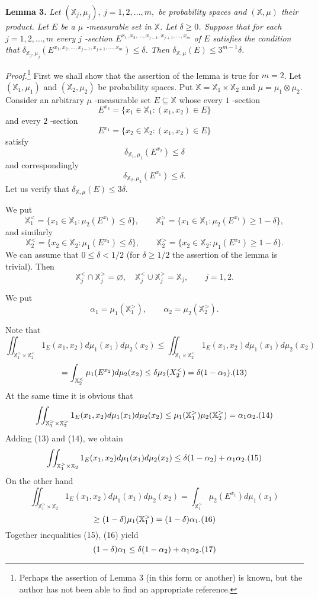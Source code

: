 \documentclass[12pt]{article}
\begin{document}
\quad

\textbf{Lemma 3.} \emph{Let $(\mathbb X_j, \mu_j), ~j=1, 2,
\ldots, m,$ be probability spaces and $(\mathbb X, \mu)$ their
product. Let $E$ be a $\mu$ -measurable set in $\mathbb X$. Let
$\delta\geq 0$. Suppose that for each $j=1, 2, \ldots, m$ every
$j$ -section $E^{x_1, x_2, \ldots, x_{j-1}, x_{j+1}, \ldots, x_m}$
of $E$ satisfies the condition that $\delta_{\mathbb X_j,
\mu_j}(E^{x_1, x_2, \ldots, x_{j-1}, x_{j+1}, \ldots, x_m})\leq
\delta$. Then $\delta_{\mathbb X, \mu}(E)\leq 3^{m-1}\delta$.}

\quad

\emph{Proof.}\footnote{Perhaps the assertion of Lemma 3 (in this
form or another) is known, but the author has not been able to
find an appropriate reference.} First we shall show that the
assertion of the lemma is true for $m=2$. Let $(\mathbb X_1,
\mu_1)$ and $(\mathbb X_2, \mu_2)$ be probability spaces. Put
$\mathbb X=\mathbb X_1\times\mathbb X_2$ and
$\mu=\mu_1\otimes\mu_2$. Consider an arbitrary $\mu$ -measurable
set $E\subseteq\mathbb X$ whose every $1$ -section
$$
E^{x_2}=\{x_1\in\mathbb X_1 : (x_1, x_2)\in E\}
$$
and every $2$ -section
$$
E^{x_1}=\{x_2\in\mathbb X_2 : (x_1, x_2)\in E\}
$$
satisfy
$$
\delta_{\mathbb X_1, \mu_1}(E^{x_2})\leq \delta
$$
and correspondingly
$$
\delta_{\mathbb X_2, \mu_2}(E^{x_1})\leq \delta.
$$
Let us verify that $\delta_{\mathbb X, \mu}(E)\leq 3\delta$.

   We put
$$
\mathbb X_1^<=\{x_1\in\mathbb X_1 : \mu_2(E^{x_1})\leq \delta\}, \qquad
\mathbb X_1^>=\{x_1\in\mathbb X_1 : \mu_2(E^{x_1})\geq 1-\delta\},
$$
and similarly
$$
\mathbb X_2^<=\{x_2\in\mathbb X_2 : \mu_1(E^{x_2})\leq \delta\}, \qquad
\mathbb X_2^>=\{x_2\in\mathbb X_2 : \mu_1(E^{x_2})\geq 1-\delta\}.
$$
We can assume that $0\leq\delta<1/2$ (for $\delta\geq 1/2$ the
assertion of the lemma is trivial). Then
$$
\mathbb X_j^<\cap\mathbb X_j^>=\varnothing, \quad
\mathbb X_j^<\cup\mathbb X_j^>=\mathbb X_j, \qquad j=1,2.
$$

   We put
$$
\alpha_1=\mu_1(\mathbb X_1^>), \qquad \alpha_2=\mu_2(\mathbb X_2^>).
$$

  Note that
$$
\iint_{\mathbb X_1^>\times\mathbb X_2^<}
1_E (x_1, x_2)d\mu_1(x_1)d\mu_2(x_2)\leq
\iint_{\mathbb X_1\times\mathbb X_2^<}
1_E (x_1, x_2)d\mu_1(x_1)d\mu_2(x_2)
$$
$$
=\int_{\mathbb X_2^<}\mu_1(E^{x_2})d\mu_2(x_2)
\leq \delta\mu_2(X_2^<)=\delta(1-\alpha_2).
\relax(13)
$$
At the same time it is obvious that
$$
\iint_{\mathbb X_1^>\times\mathbb X_2^>}
1_E (x_1, x_2)d\mu_1(x_1)d\mu_2(x_2)\leq
\mu_1(\mathbb X_1^>)\mu_2(\mathbb X_2^>)=
\alpha_1\alpha_2.
\relax(14)
$$
Adding (13) and (14), we obtain
$$
\iint_{\mathbb X_1^>\times\mathbb X_2}
1_E (x_1, x_2)d\mu_1(x_1)d\mu_2(x_2)\leq
\delta(1-\alpha_2)+\alpha_1\alpha_2.
\relax(15)
$$
On the other hand
$$
\iint_{\mathbb X_1^>\times\mathbb X_2}
1_E (x_1, x_2)d\mu_1(x_1)d\mu_2(x_2)=
\int_{\mathbb X_1^>}\mu_2(E^{x_1})d\mu_1(x_1)
$$
$$
\geq (1-\delta)\mu_1(\mathbb X_1^>)=(1-\delta)\alpha_1.
\relax(16)
$$
Together inequalities (15), (16) yield
$$
(1-\delta)\alpha_1\leq \delta(1-\alpha_2)+\alpha_1\alpha_2.
\relax(17)
$$
\end{document}
